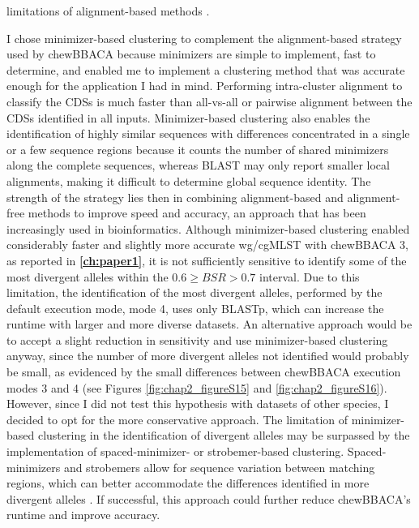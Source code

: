 limitations of alignment-based methods \cite{borozan_integrating_2015, zielezinski_alignment-free_2017}.

I chose minimizer-based clustering to complement the alignment-based strategy used by chewBBACA because minimizers are simple to implement, fast to determine, and enabled me to implement a clustering method that was accurate enough for the application I had in mind. Performing intra-cluster alignment to classify the \ac{CDSs} is much faster than all-vs-all or pairwise alignment between the \ac{CDSs} identified in all inputs. Minimizer-based clustering also enables the identification of highly similar sequences with differences concentrated in a single or a few sequence regions because it counts the number of shared minimizers along the complete sequences, whereas \ac{BLAST} may only report smaller local alignments, making it difficult to determine global sequence identity. The strength of the strategy lies then in combining alignment-based and alignment-free methods to improve speed and accuracy, an approach that has been increasingly used in bioinformatics. Although minimizer-based clustering enabled considerably faster and slightly more accurate \ac{wg/cgMLST} with chewBBACA 3, as reported in \textbf{\autoref{ch:paper1}}, it is not sufficiently sensitive to identify some of the most divergent alleles within the $0.6\geq BSR > 0.7$ interval. Due to this limitation, the identification of the most divergent alleles, performed by the default execution mode, mode 4, uses only \ac{BLASTp}, which can increase the runtime with larger and more diverse datasets. An alternative approach would be to accept a slight reduction in sensitivity and use minimizer-based clustering anyway, since the number of more divergent alleles not identified would probably be small, as evidenced by the small differences between chewBBACA execution modes 3 and 4 (see Figures \ref{fig:chap2_figureS15} and \ref{fig:chap2_figureS16}). However, since I did not test this hypothesis with datasets of other species, I decided to opt for the more conservative approach. The limitation of minimizer-based clustering in the identification of divergent alleles may be surpassed by the implementation of spaced-minimizer- or strobemer-based clustering. Spaced-minimizers and strobemers allow for sequence variation between matching regions, which can better accommodate the differences identified in more divergent alleles \cite{sahlin_effective_2021, karami_designing_2024}. If successful, this approach could further reduce chewBBACA's runtime and improve accuracy.

